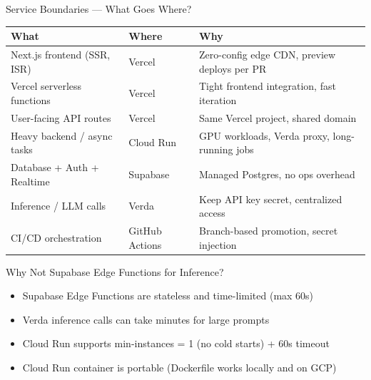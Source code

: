 \documentclass[10pt,aspectratio=169,t]{beamer}
\begin{document}
\begin{frame}{Service Boundaries --- What Goes Where?}

  \begin{table}
    \centering
    \small
    \begin{tabular}{p{3.5cm}p{4cm}p{2.5cm}}
      \toprule
      \textbf{What} & \textbf{Where} & \textbf{Why} \\
      \midrule
      Next.js frontend (SSR, ISR) & \cellcolor{HackBlue} Vercel & Zero-config edge CDN, preview deploys per PR \\
      Vercel serverless functions & \cellcolor{HackBlue} Vercel & Tight frontend integration, fast iteration \\
      User-facing API routes & \cellcolor{HackBlue} Vercel & Same Vercel project, shared domain \\
      Heavy backend / async tasks & \cellcolor{GCPBlue} Cloud Run & GPU workloads, Verda proxy, long-running jobs \\
      Database + Auth + Realtime & \cellcolor{SupabaseGreen} Supabase & Managed Postgres, no ops overhead \\
      Inference / LLM calls & \cellcolor{HackPurple} Verda & Keep API key secret, centralized access \\
      CI/CD orchestration & \cellcolor{HackDark} GitHub Actions & Branch-based promotion, secret injection \\
      \bottomrule
    \end{tabular}
  \end{table}

  \vfill

  \begin{block}{Why Not Supabase Edge Functions for Inference?}
    \begin{itemize}
      \item Supabase Edge Functions are stateless and time-limited (max 60s)
      \item Verda inference calls can take minutes for large prompts
      \item Cloud Run supports min-instances = 1 (no cold starts) + 60s timeout
      \item Cloud Run container is portable (Dockerfile works locally and on GCP)
    \end{itemize}
  \end{block}

\end{frame}
\end{document}
